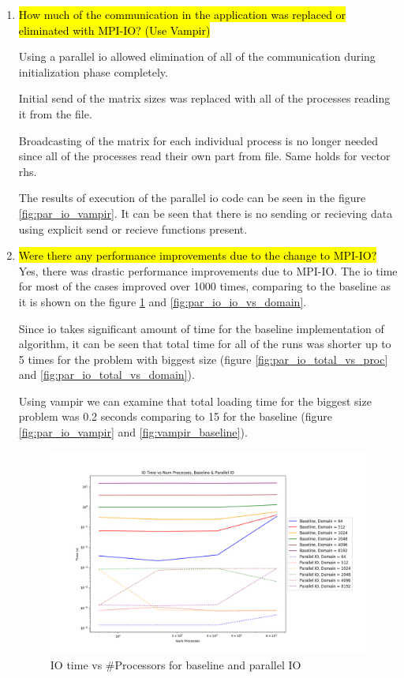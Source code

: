 \begin{enumerate}
  \item \hl{How much of the communication in the application was replaced or eliminated with MPI-IO? (Use
Vampir)}

  Using a parallel io allowed elimination of all of the communication during initialization phase completely.

  Initial send of the matrix sizes was replaced with all of the processes reading it from the file.

  Broadcasting of the matrix for each individual process is no longer needed since all of the processes read their own 
  part from file. Same holds for vector rhs.

  The results of execution of the parallel io code can be seen in the figure \ref{fig:par_io_vampir}. It can be seen
  that there is no sending or recieving data using explicit send or recieve functions present.

  \item \hl{Were there any performance improvements due to the change to MPI-IO?}
  Yes, there was drastic performance improvements due to MPI-IO. The io time for most of the cases improved over 1000
  times, comparing to the baseline as it is shown on the figure \ref{fig:par_io_io_vs_proc} and 
  \ref{fig:par_io_io_vs_domain}.

  Since io takes significant amount of time for the baseline implementation of algorithm, it can be seen that 
  total time for all of the runs was shorter up to 5 times for the problem with biggest size (figure 
  \ref{fig:par_io_total_vs_proc} and \ref{fig:par_io_total_vs_domain}).

  Using vampir we can examine that total loading time for the biggest size problem was 0.2 seconds comparing to 15 
  for the baseline (figure \ref{fig:par_io_vampir} and \ref{fig:vampir_baseline}).

  \begin{figure}[p] %
    \begin{center}
      \includegraphics[width=.9\linewidth]{Figures/io/io_multdomain_haswell_io_baseline.png} %
      \caption{IO time vs \#Processors for baseline and parallel IO}
      \label{fig:par_io_io_vs_proc}
    \end{center}
 \end{figure}
 

\end{enumerate}
